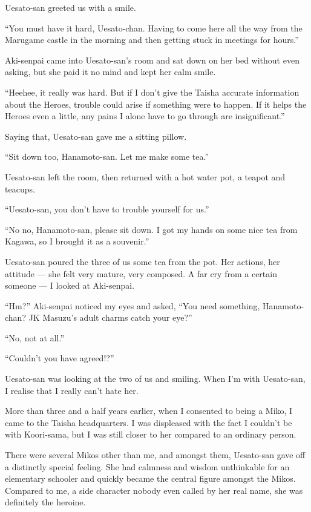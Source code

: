 Uesato-san greeted us with a smile.

``You must have it hard, Uesato-chan. Having to come here all the way from the Marugame castle in the morning and then getting stuck in meetings for hours.''

Aki-senpai came into Uesato-san's room and sat down on her bed without even asking, but she paid it no mind and kept her calm smile.

``Heehee, it really was hard. But if I don't give the Taisha accurate information about the Heroes, trouble could arise if something were to happen. If it helps the Heroes even a little, any pains I alone have to go through are insignificant.''

Saying that, Uesato-san gave me a sitting pillow.

``Sit down too, Hanamoto-san. Let me make some tea.''

Uesato-san left the room, then returned with a hot water pot, a teapot and teacups.

``Uesato-san, you don't have to trouble yourself for us.''

``No no, Hanamoto-san, please sit down. I got my hands on some nice tea from Kagawa, so I brought it as a souvenir.''

Uesato-san poured the three of us some tea from the pot. Her actions, her attitude --- she felt very mature, very composed. A far cry from a certain someone --- I looked at Aki-senpai.

``Hm?'' Aki-senpai noticed my eyes and asked, ``You need something, Hanamoto-chan? JK Masuzu's adult charms catch your eye?''

``No, not at all.''

``Couldn't you have agreed!?''

Uesato-san was looking at the two of us and smiling. When I'm with Uesato-san, I realise that I really can't hate her.

More than three and a half years earlier, when I consented to being a Miko, I came to the Taisha headquarters. I was displeased with the fact I couldn't be with Koori-sama, but I was still closer to her compared to an ordinary person.

There were several Mikos other than me, and amongst them, Uesato-san gave off a distinctly special feeling. She had calmness and wisdom unthinkable for an elementary schooler and quickly became the central figure amongst the Mikos. Compared to me, a side character nobody even called by her real name, she was definitely the heroine.

